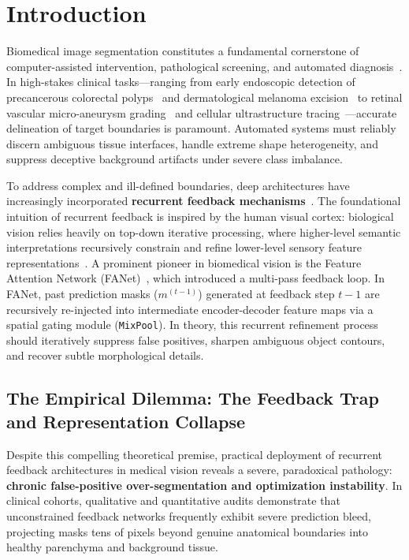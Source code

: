 \section{Introduction}
\label{sec:intro}

Biomedical image segmentation constitutes a fundamental cornerstone of computer-assisted intervention, pathological screening, and automated diagnosis~\cite{litjens2017survey, ronneberger2015unet}. In high-stakes clinical tasks---ranging from early endoscopic detection of precancerous colorectal polyps~\cite{siegel2023colorectal, jha2020kvasir, bernal2017comparative} and dermatological melanoma excision~\cite{codella2019skin} to retinal vascular micro-aneurysm grading~\cite{hoover2000locating, staal2004ridge} and cellular ultrastructure tracing~\cite{cardona2010integrated, caicedo2019nucleus}---accurate delineation of target boundaries is paramount. Automated systems must reliably discern ambiguous tissue interfaces, handle extreme shape heterogeneity, and suppress deceptive background artifacts under severe class imbalance.

To address complex and ill-defined boundaries, deep architectures have increasingly incorporated \textbf{recurrent feedback mechanisms}~\cite{tomar2021fanet, liang2015recurrent, alom2018recurrent, tomar2021ddanet}. The foundational intuition of recurrent feedback is inspired by the human visual cortex: biological vision relies heavily on top-down iterative processing, where higher-level semantic interpretations recursively constrain and refine lower-level sensory feature representations~\cite{gilbert2013top, kietzmann2019recurrence}. A prominent pioneer in biomedical vision is the Feature Attention Network (FANet)~\cite{tomar2021fanet}, which introduced a multi-pass feedback loop. In FANet, past prediction masks ($m^{(t-1)}$) generated at feedback step $t-1$ are recursively re-injected into intermediate encoder-decoder feature maps via a spatial gating module (\texttt{MixPool}). In theory, this recurrent refinement process should iteratively suppress false positives, sharpen ambiguous object contours, and recover subtle morphological details.

\subsection{The Empirical Dilemma: The Feedback Trap and Representation Collapse}
Despite this compelling theoretical premise, practical deployment of recurrent feedback architectures in medical vision reveals a severe, paradoxical pathology: \textbf{chronic false-positive over-segmentation and optimization instability}. In clinical cohorts, qualitative and quantitative audits demonstrate that unconstrained feedback networks frequently exhibit severe prediction bleed, projecting masks tens of pixels beyond genuine anatomical boundaries into healthy parenchyma and background tissue. 

